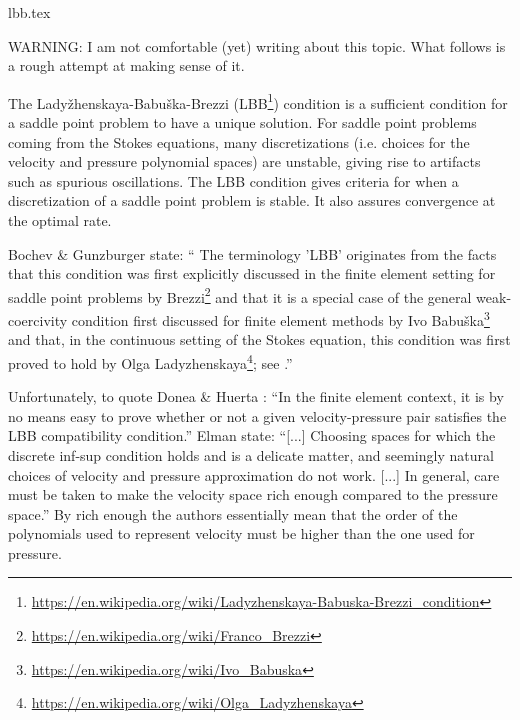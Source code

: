 \begin{flushright} {\tiny {\color{gray} lbb.tex}} \end{flushright}

WARNING: I am not comfortable (yet) writing about this topic. 
What follows is a rough attempt at making sense of it.

\hspace{.4cm}

The Lady{\v z}henskaya-Babu{\v s}ka-Brezzi (LBB\footnote{
\url{https://en.wikipedia.org/wiki/Ladyzhenskaya-Babuska-Brezzi_condition}}) condition is a sufficient 
condition for a saddle point problem to have a unique solution.
For saddle point problems coming from the Stokes equations, 
many discretizations (i.e. choices for the velocity and pressure polynomial spaces)
are unstable, giving rise to artifacts such as spurious oscillations. 
The LBB condition gives criteria for when a discretization of a saddle point problem is stable. 
It also assures convergence at the optimal rate. 

Bochev \& Gunzburger \cite{bogu09} state: ``
The terminology 'LBB' originates from the facts that this condition was first explicitly discussed
in the finite element setting for saddle point problems by Brezzi\footnote{
\url{https://en.wikipedia.org/wiki/Franco_Brezzi}} \cite{brez74} and that it is a special case of
the general weak-coercivity condition first discussed for finite element methods by Ivo Babu{\v s}ka\footnote{
\url{https://en.wikipedia.org/wiki/Ivo_Babuska}}
\cite{babu71} and that, in the continuous setting of the Stokes equation, this condition was first proved to
hold by Olga Ladyzhenskaya\footnote{\url{https://en.wikipedia.org/wiki/Olga_Ladyzhenskaya}}; see \cite{lady69}.''

Unfortunately, to quote Donea \& Huerta \cite{dohu03}: 
``In the finite element context, it is by no means easy to prove whether or not a given
velocity-pressure pair satisfies the LBB compatibility condition.''
Elman \etal state: ``[...] Choosing spaces for which the discrete inf-sup condition holds
and is a delicate matter, and seemingly natural choices of velocity and pressure approximation
do not work. [...] In general, care must be taken to make the velocity space 
rich enough compared to the pressure space.'' By rich enough the authors essentially mean that 
the order of the polynomials used to represent velocity must be higher than the one used 
for pressure.

